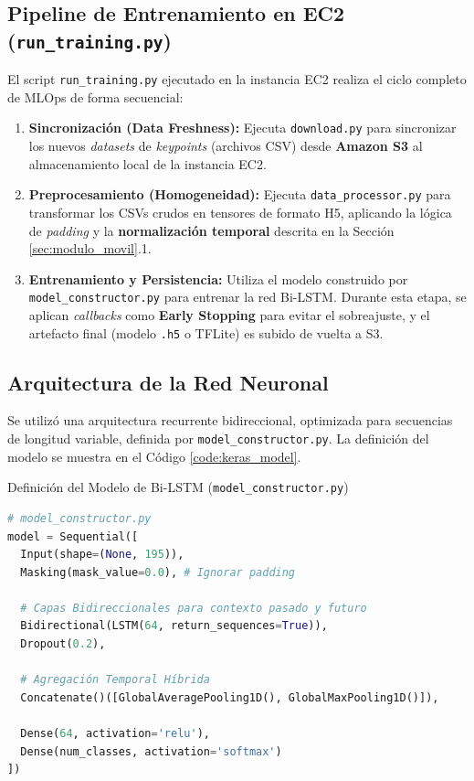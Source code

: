 \subsection{Pipeline de Entrenamiento en EC2 (\texttt{run\_training.py})}
El script \texttt{run\_training.py} ejecutado en la instancia EC2 realiza el ciclo completo de MLOps de forma secuencial:

\begin{enumerate}
    \item \textbf{Sincronización (Data Freshness):} Ejecuta \texttt{download.py} para sincronizar los nuevos \textit{datasets} de \textit{keypoints} (archivos CSV) desde \textbf{Amazon S3} al almacenamiento local de la instancia EC2.
    \item \textbf{Preprocesamiento (Homogeneidad):} Ejecuta \texttt{data\_processor.py} para transformar los CSVs crudos en tensores de formato H5, aplicando la lógica de \textit{padding} y la \textbf{normalización temporal} descrita en la Sección \ref{sec:modulo_movil}.1.
    \item \textbf{Entrenamiento y Persistencia:} Utiliza el modelo construido por \texttt{model\_constructor.py} para entrenar la red Bi-LSTM. Durante esta etapa, se aplican \textit{callbacks} como \textbf{Early Stopping} para evitar el sobreajuste, y el artefacto final (modelo \texttt{.h5} o TFLite) es subido de vuelta a S3.
\end{enumerate}

\subsection{Arquitectura de la Red Neuronal}
Se utilizó una arquitectura recurrente bidireccional, optimizada para secuencias de longitud variable, definida por \texttt{model\_constructor.py}. La definición del modelo se muestra en el Código \ref{code:keras_model}.

\begin{codebox}{Definición del Modelo de Bi-LSTM (\texttt{model\_constructor.py})}
\begin{lstlisting}[language=python, caption={Definición del Modelo de Bi-LSTM (\texttt{model\_constructor.py})}, label=code:keras_model]
# model_constructor.py
model = Sequential([
  Input(shape=(None, 195)),
  Masking(mask_value=0.0), # Ignorar padding

  # Capas Bidireccionales para contexto pasado y futuro
  Bidirectional(LSTM(64, return_sequences=True)),
  Dropout(0.2),

  # Agregación Temporal Híbrida
  Concatenate()([GlobalAveragePooling1D(), GlobalMaxPooling1D()]),

  Dense(64, activation='relu'),
  Dense(num_classes, activation='softmax')
])
\end{lstlisting}
\end{codebox}

